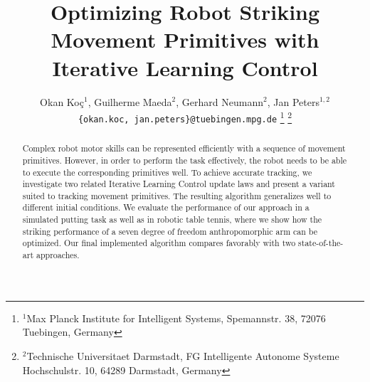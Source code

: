 \documentclass[letterpaper, 10 pt, conference]{ieeeconf}  %
\title{\LARGE \bf
Optimizing Robot Striking Movement Primitives with Iterative Learning Control
}
\author{Okan Ko\c c$^{1}$, Guilherme Maeda$^{2}$, Gerhard Neumann${^2}$, Jan Peters$^{1,2}$%
\\
{\tt\small \{okan.koc, jan.peters\}@tuebingen.mpg.de}%
\thanks{$^{1}$Max Planck Institute for Intelligent Systems,
        Spemannstr. 38, 72076 Tuebingen, Germany}
\thanks{$^{2}$Technische Universitaet Darmstadt, FG Intelligente Autonome Systeme
        Hochschulstr. 10, 64289 Darmstadt, Germany}
}
\begin{document}
\maketitle
\thispagestyle{empty}
\pagestyle{empty}

\begin{abstract}

Complex robot motor skills can be represented efficiently with a sequence of movement primitives. However, in order to perform the task effectively, the robot needs to be able to execute the corresponding primitives well. To achieve accurate tracking, we investigate two related Iterative Learning Control update laws and present a variant suited to tracking movement primitives. The resulting algorithm generalizes well to different initial conditions. We evaluate the performance of our approach in a simulated putting task as well as in 
robotic table tennis,
where we show how the striking performance of a seven degree of freedom anthropomorphic arm can be optimized. Our final implemented algorithm compares favorably with two state-of-the-art approaches.

\end{abstract}








%
%

\end{document}
